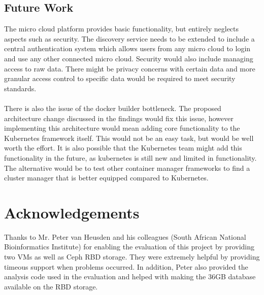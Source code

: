 \documentclass{sig-alternate-05-2015}
\begin{document}
\subsection{Future Work}
The micro cloud platform provides basic functionality, but entirely neglects aspects such as security. The discovery service needs to be extended to include a central authentication system which allows users from any micro cloud to login and use any other connected micro cloud. Security would also include managing access to raw data. There might be privacy concerns with certain data and more granular access control to specific data would be required to meet security standards.
\\\\
There is also the issue of the docker builder bottleneck. The proposed architecture change discussed in the findings would fix this issue, however implementing this architecture would mean adding core functionality to the Kubernetes framework itself. This would not be an easy task, but would be well worth the effort. It is also possible that the Kubernetes team might add this functionality in the future, as kubernetes is still new and limited in functionality. The alternative would be to test other container manager frameworks to find a cluster manager that is better equipped compared to Kubernetes.

\section{Acknowledgements}
Thanks to Mr. Peter van Heusden and his colleagues (South African National Bioinformatics Institute) for enabling the evaluation of this project by providing two VMs as well as Ceph RBD storage. They were extremely helpful by providing timeous support when problems occurred. In addition, Peter also provided the analysis code used in the evaluation and helped with making the 36GB database available on the RBD storage.
\\

 
\end{document}
